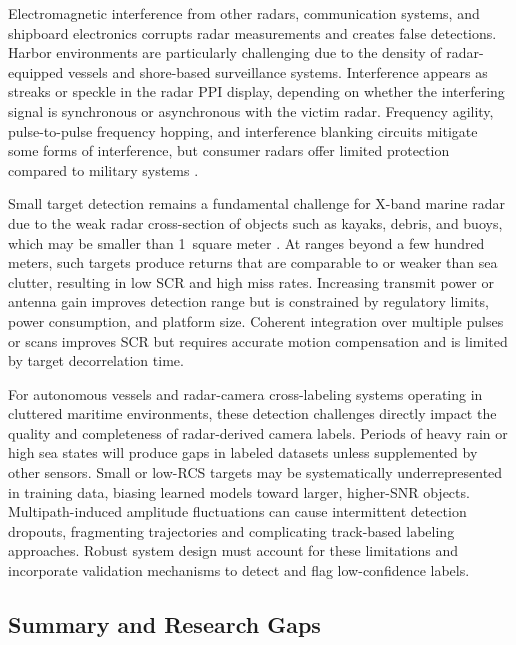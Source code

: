 Electromagnetic interference from other radars, communication systems, and shipboard electronics corrupts radar measurements and creates false detections. Harbor environments are particularly challenging due to the density of radar-equipped vessels and shore-based surveillance systems. Interference appears as streaks or speckle in the radar PPI display, depending on whether the interfering signal is synchronous or asynchronous with the victim radar. Frequency agility, pulse-to-pulse frequency hopping, and interference blanking circuits mitigate some forms of interference, but consumer radars offer limited protection compared to military systems \cite{DHS2009}.

Small target detection remains a fundamental challenge for X-band marine radar due to the weak radar cross-section of objects such as kayaks, debris, and buoys, which may be smaller than 1~square meter \cite{Roldan2024}. At ranges beyond a few hundred meters, such targets produce returns that are comparable to or weaker than sea clutter, resulting in low SCR and high miss rates. Increasing transmit power or antenna gain improves detection range but is constrained by regulatory limits, power consumption, and platform size. Coherent integration over multiple pulses or scans improves SCR but requires accurate motion compensation and is limited by target decorrelation time.

For autonomous vessels and radar-camera cross-labeling systems operating in cluttered maritime environments, these detection challenges directly impact the quality and completeness of radar-derived camera labels. Periods of heavy rain or high sea states will produce gaps in labeled datasets unless supplemented by other sensors. Small or low-RCS targets may be systematically underrepresented in training data, biasing learned models toward larger, higher-SNR objects. Multipath-induced amplitude fluctuations can cause intermittent detection dropouts, fragmenting trajectories and complicating track-based labeling approaches. Robust system design must account for these limitations and incorporate validation mechanisms to detect and flag low-confidence labels.

\subsection{Summary and Research Gaps}

